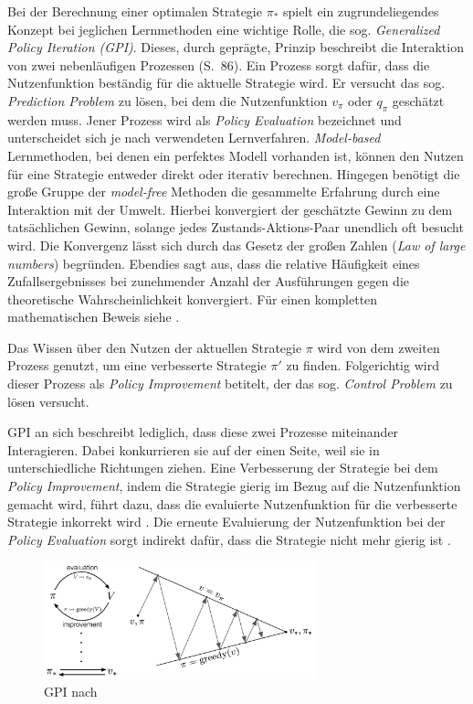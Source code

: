 Bei der Berechnung einer optimalen Strategie $\pi_*$ spielt ein zugrundeliegendes Konzept  bei jeglichen Lernmethoden eine wichtige Rolle, die sog. \textit{Generalized Policy Iteration (GPI)}. Dieses, durch \cite{Sutton1998} geprägte, Prinzip beschreibt die Interaktion von zwei nebenläufigen Prozessen (S.~86). Ein Prozess sorgt dafür, dass die Nutzenfunktion beständig für die aktuelle Strategie wird. Er versucht das sog. \textit{Prediction Problem} zu lösen, bei dem die Nutzenfunktion $v_{\pi}$ oder $q_{\pi}$ geschätzt werden muss. Jener Prozess wird als \textit{Policy Evaluation} bezeichnet und unterscheidet sich je nach verwendeten Lernverfahren. \textit{Model-based} Lernmethoden, bei denen ein perfektes Modell vorhanden ist, können den Nutzen für eine Strategie entweder direkt oder iterativ berechnen. Hingegen benötigt die große Gruppe der \textit{model-free} Methoden die gesammelte Erfahrung durch eine Interaktion mit der Umwelt. Hierbei konvergiert der geschätzte Gewinn zu dem tatsächlichen Gewinn, solange jedes Zustands-Aktions-Paar unendlich oft besucht wird. Die Konvergenz lässt sich durch das \glqq Gesetz der großen Zahlen\grqq{} (\textit{Law of large numbers}) begründen.
Ebendies sagt aus, dass die relative Häufigkeit eines Zufallsergebnisses bei zunehmender Anzahl der Ausführungen gegen die theoretische Wahrscheinlichkeit konvergiert. Für einen kompletten mathematischen Beweis siehe \cite[S.~181-189]{dekking2006modern}.
\par 
Das Wissen über den Nutzen der aktuellen Strategie $\pi$ wird von dem zweiten Prozess genutzt, um eine verbesserte Strategie $\pi'$ zu finden. Folgerichtig wird dieser Prozess als \textit{Policy Improvement} betitelt, der das sog. \textit{Control Problem} zu lösen versucht.
\par 
GPI an sich beschreibt lediglich, dass diese zwei Prozesse miteinander Interagieren. Dabei konkurrieren sie auf der einen Seite, weil sie in unterschiedliche Richtungen ziehen. Eine Verbesserung der Strategie bei dem \textit{Policy Improvement}, indem die Strategie gierig im Bezug auf die Nutzenfunktion gemacht wird, führt dazu, dass die evaluierte Nutzenfunktion für die verbesserte Strategie inkorrekt wird \cite[S.~86]{Sutton1998}. Die erneute Evaluierung der Nutzenfunktion bei der \textit{Policy Evaluation} sorgt indirekt dafür, dass die Strategie nicht mehr gierig ist \cite[S.~86]{Sutton1998}.
\par 
\begin{figure}[H]
    \centering
    \includegraphics[width=0.7\textwidth]{images/gpi.jpg}
    \caption{GPI nach \cite[S.~86f]{Sutton1998}}
    \label{fig:GPI}
\end{figure}

